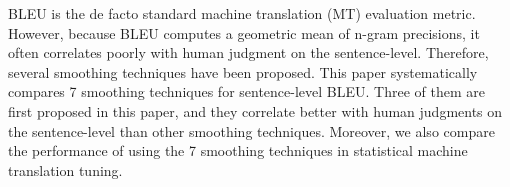 BLEU is the de facto standard machine translation (MT) evaluation metric. However, because BLEU computes a geometric mean of n-gram precisions, it often correlates poorly with human judgment on the sentence-level. Therefore, several smoothing techniques have been proposed. This paper systematically compares 7 smoothing techniques for sentence-level BLEU. Three of them are first proposed in this paper, and they correlate better with human judgments on the sentence-level than other smoothing techniques. Moreover, we also compare the performance of using the 7 smoothing techniques in statistical machine translation tuning.
